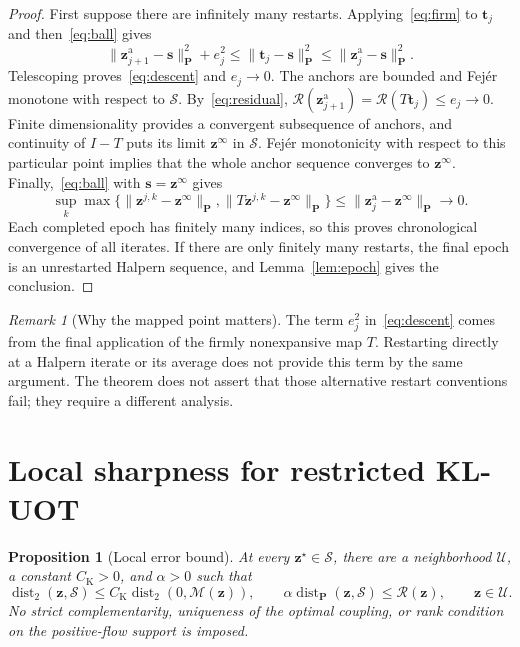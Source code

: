 \documentclass[11pt]{article}
\newtheorem{proposition}[theorem]{Proposition}
\theoremstyle{remark}
\newtheorem{remark}[theorem]{Remark}
\newcommand{\dist}{\operatorname{dist}}
\newcommand{\np}[1]{\lVert#1\rVert_{\mathbf P}}
\newcommand{\dd}[1]{\operatorname{dist}_{\mathbf P}(#1,\mathcal S)}
\newcommand{\res}{\mathcal R}
\begin{document}
\begin{proof}
First suppose there are infinitely many restarts.
Applying~\eqref{eq:firm} to $\mathbf t_j$ and then~\eqref{eq:ball} gives
\begin{equation}
\np{\mathbf z_{j+1}^{\mathrm a}-\mathbf s}^2+e_j^2\leq\np{\mathbf t_j-\mathbf s}^2\leq\np{\mathbf z_j^{\mathrm a}-\mathbf s}^2.
\end{equation}
Telescoping proves~\eqref{eq:descent} and $e_j\to0$.
The anchors are bounded and Fej\'er monotone with respect to $\mathcal S$.
By~\eqref{eq:residual}, $\res(\mathbf z_{j+1}^{\mathrm a})=\res(T\mathbf t_j)\leq e_j\to0$.
Finite dimensionality provides a convergent subsequence of anchors, and continuity of $I-T$ puts its limit $\mathbf z^\infty$ in $\mathcal S$.
Fej\'er monotonicity with respect to this particular point implies that the whole anchor sequence converges to $\mathbf z^\infty$.
Finally,~\eqref{eq:ball} with $\mathbf s=\mathbf z^\infty$ gives
\begin{equation}
\sup_k\max\{\np{\mathbf z^{j,k}-\mathbf z^\infty},\np{T\mathbf z^{j,k}-\mathbf z^\infty}\}\leq\np{\mathbf z_j^{\mathrm a}-\mathbf z^\infty}\longrightarrow0.
\label{eq:whole}
\end{equation}
Each completed epoch has finitely many indices, so this proves chronological convergence of all iterates.
If there are only finitely many restarts, the final epoch is an unrestarted Halpern sequence, and Lemma~\ref{lem:epoch} gives the conclusion.
\end{proof}

\begin{remark}[Why the mapped point matters]
The term $e_j^2$ in~\eqref{eq:descent} comes from the final application of the firmly nonexpansive map $T$.
Restarting directly at a Halpern iterate or its average does not provide this term by the same argument.
The theorem does not assert that those alternative restart conventions fail; they require a different analysis.
\end{remark}

\section{Local sharpness for restricted KL-UOT}

\begin{proposition}[Local error bound]
\label{prop:sharpness}
At every $\mathbf z^\star\in\mathcal S$, there are a neighborhood $\mathcal U$, a constant $C_{\mathrm K}>0$, and $\alpha>0$ such that
\begin{equation}
\dist_2(\mathbf z,\mathcal S)\leq C_{\mathrm K}\dist_2(0,\mathcal M(\mathbf z)),\qquad \alpha\dd{\mathbf z}\leq\res(\mathbf z),\qquad \mathbf z\in\mathcal U.
\label{eq:sharpness}
\end{equation}
No strict complementarity, uniqueness of the optimal coupling, or rank condition on the positive-flow support is imposed.
\end{proposition}
\end{document}
